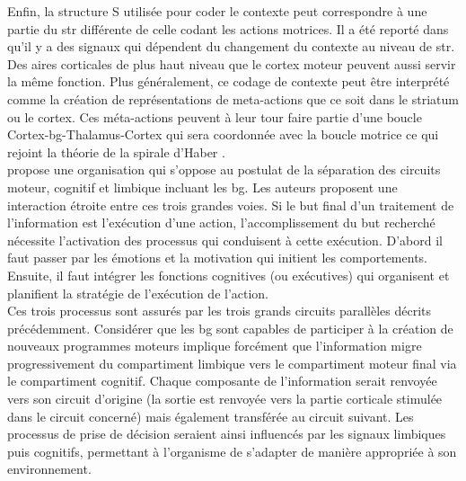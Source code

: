 Enfin, la structure S utilisée pour coder le contexte peut correspondre à une partie du \gls{str} différente de celle codant les actions motrices. Il a été reporté dans \cite{Hikosaka:1989, Kimura:2003} qu'il y a des signaux qui dépendent du changement du contexte au niveau de \gls{str}. Des aires corticales de plus haut niveau que le cortex moteur peuvent aussi servir la même fonction. Plus généralement, ce codage de contexte peut être interprété comme la création de représentations de meta-actions que ce soit dans le striatum ou le cortex. Ces m\'eta-actions peuvent à leur tour faire partie d'une boucle Cortex-\gls{bg}-Thalamus-Cortex qui sera coordonnée avec la boucle motrice ce qui rejoint la théorie de la spirale d'Haber \cite{Haber:2000}.\\ 

\cite{Haber:2003} propose une organisation qui s'oppose au postulat de la séparation des circuits moteur, cognitif et limbique incluant les \gls{bg}. Les auteurs proposent une interaction étroite entre ces trois grandes voies. Si le but final d'un traitement de l'information est l'exécution d'une action, l'accomplissement du but recherché nécessite l'activation des processus qui conduisent à cette exécution. D'abord il faut passer par les émotions et la motivation qui initient les comportements. Ensuite, il faut intégrer les fonctions cognitives (ou exécutives) qui organisent et planifient la stratégie de l'exécution de l'action.\\

Ces trois processus sont assurés par les trois grands circuits parallèles décrits précédemment. Considérer que les \gls{bg} sont capables de participer à la création de nouveaux programmes moteurs implique forcément que l'information migre progressivement du compartiment limbique vers le compartiment moteur final via le compartiment cognitif. Chaque composante de l'information serait renvoyée vers son circuit d'origine (la sortie est renvoyée vers la partie corticale stimulée dans le circuit concerné) mais également transférée au circuit suivant. Les processus de prise de décision seraient ainsi influencés par les signaux limbiques puis cognitifs, permettant à l'organisme de s'adapter de manière appropriée à son environnement.\\
